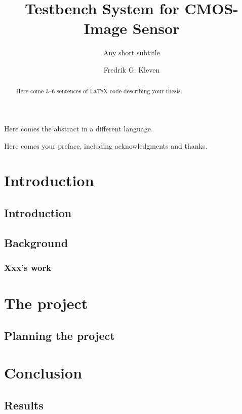 \documentclass[UKenglish]{uiomasterthesis}  %
\title{Testbench System for CMOS-Image Sensor}        %
\subtitle{Any short subtitle}         %
\author{Fredrik G. Kleven}                      %
\begin{document}
\uiomasterfp[dept={Department of Physics},  %
  program={Electronics, Informatics and Technology},                        %
  supervisor={Philipp Häfliger},               %
  long]                                     %

\frontmatter{}
\begin{abstract}
  Here come 3--6 sentences of \LaTeX{}\cite{LaTeX-original} code
  describing your thesis.
\end{abstract}

\begin{xabstract}[Sammendrag]               %
  Here comes the abstract in a different language.
\end{xabstract}

\tableofcontents{}                          %
\listoffigures{}                            %
\listoftables{}                             %

\begin{preface}
  Here comes your preface, including acknowledgments and thanks.
\end{preface}

\mainmatter{}
\part{Introduction}                   %
\chapter{Introduction}



\chapter{Background}                  %
\section{Xxx's work}                  %

\part{The project}                    %
\chapter{Planning the project}        %

\part{Conclusion}                     %
\chapter{Results}                     %

\backmatter{}
\printbibliography{}
\end{document}
